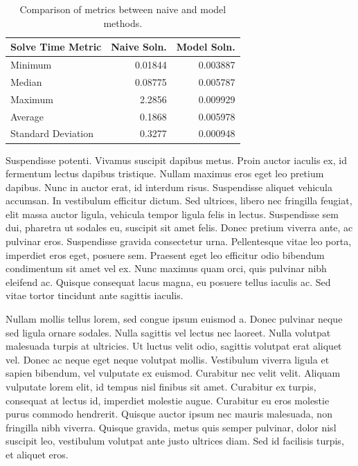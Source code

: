 \documentclass[
	letterpaper, %
	10pt, %
	unnumberedsections, %
	twoside, %
]{LTJournalArticle}
\begin{document}
\begin{table}
    \caption{Comparison of metrics between naive and model methods.}
    \centering
    \begin{tabular}{l r r}
        \toprule
        Solve Time Metric & Naive Soln. & Model Soln. \\
        \midrule
        Minimum & 0.01844  & 0.003887 \\
        Median  & 0.08775  & 0.005787 \\
        Maximum & 2.2856   & 0.009929 \\
        Average & 0.1868   & 0.005978 \\
        Standard Deviation & 0.3277 & 0.000948 \\
        \bottomrule
    \end{tabular}
\end{table}

Suspendisse potenti. Vivamus suscipit dapibus metus. Proin auctor iaculis ex, id fermentum lectus dapibus tristique. Nullam maximus eros eget leo pretium dapibus. Nunc in auctor erat, id interdum risus. Suspendisse aliquet vehicula accumsan. In vestibulum efficitur dictum. Sed ultrices, libero nec fringilla feugiat, elit massa auctor ligula, vehicula tempor ligula felis in lectus. Suspendisse sem dui, pharetra ut sodales eu, suscipit sit amet felis. Donec pretium viverra ante, ac pulvinar eros. Suspendisse gravida consectetur urna. Pellentesque vitae leo porta, imperdiet eros eget, posuere sem. Praesent eget leo efficitur odio bibendum condimentum sit amet vel ex. Nunc maximus quam orci, quis pulvinar nibh eleifend ac. Quisque consequat lacus magna, eu posuere tellus iaculis ac. Sed vitae tortor tincidunt ante sagittis iaculis.

Nullam mollis tellus lorem, sed congue ipsum euismod a. Donec pulvinar neque sed ligula ornare sodales. Nulla sagittis vel lectus nec laoreet. Nulla volutpat malesuada turpis at ultricies. Ut luctus velit odio, sagittis volutpat erat aliquet vel. Donec ac neque eget neque volutpat mollis. Vestibulum viverra ligula et sapien bibendum, vel vulputate ex euismod. Curabitur nec velit velit. Aliquam vulputate lorem elit, id tempus nisl finibus sit amet. Curabitur ex turpis, consequat at lectus id, imperdiet molestie augue. Curabitur eu eros molestie purus commodo hendrerit. Quisque auctor ipsum nec mauris malesuada, non fringilla nibh viverra. Quisque gravida, metus quis semper pulvinar, dolor nisl suscipit leo, vestibulum volutpat ante justo ultrices diam. Sed id facilisis turpis, et aliquet eros.
\end{document}
